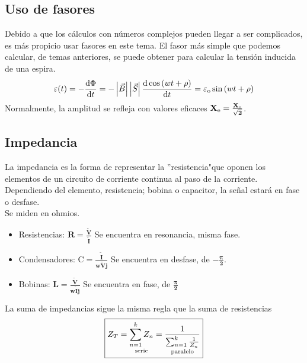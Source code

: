 \subsection{Uso de fasores}
\noindent Debido a que los cálculos con números complejos pueden llegar a ser complicados, es más propicio usar fasores en este tema. El fasor más simple que podemos calcular, de temas anteriores, se puede obtener para calcular la tensión inducida de una espira.
\[
        \varepsilon (t) = -\frac{\mathrm{d} \Phi}{\mathrm{d} t} = -\left | \vec{B} \right |\left | \vec{S} \right |\frac{\mathrm{d} \cos{(wt+\rho )}}{\mathrm{d} t} = \varepsilon_{\textnormal{o}}\sin{(wt + \rho)}
\]
\noindent Normalmente, la amplitud se refleja con valores eficaces \(\mathbf{X_{\textnormal{e}} = \frac{X_{\textnormal{o}}}{\sqrt{2}}}\).
\subsection{Impedancia}
\noindent La impedancia es la forma de representar la ''resistencia"\space que oponen los elementos de un circuito de corriente continua al paso de la corriente.\\
Dependiendo del elemento, resistencia; bobina o capacitor, la señal estará en fase o desfase.\\ Se miden en ohmios.
\begin{itemize}
        \item Resistencias:
              \(\boxed{\mathbf{R = \frac{\tilde{V}}{\tilde{I}}}}\) Se encuentra en resonancia, misma fase.
        \item Condensadores:
              \(\boxed{\mathbf{\mathrm{C} = \frac{\tilde{I}}{w\tilde{V}j}}}\) Se encuentra en desfase, de \(\mathbf{-\frac{\pi}{2}}\).
        \item Bobinas:
              \(\boxed{\mathbf{L = \frac{\tilde{V}}{w\tilde{I}j}}}\) Se encuentra en fase, de \(\mathbf{\frac{\pi}{2}}\)
\end{itemize}
La suma de impedancias sigue la misma regla que la suma de resistencias \[
        \boxed{Z_T = \underset{\textnormal{serie}}{\sum_{n=1}^{k} Z_n} = \underset{\textnormal{paralelo}}{\frac{1}{\sum_{n=1}^{k}\frac{1}{Z_n}}}}
\]
